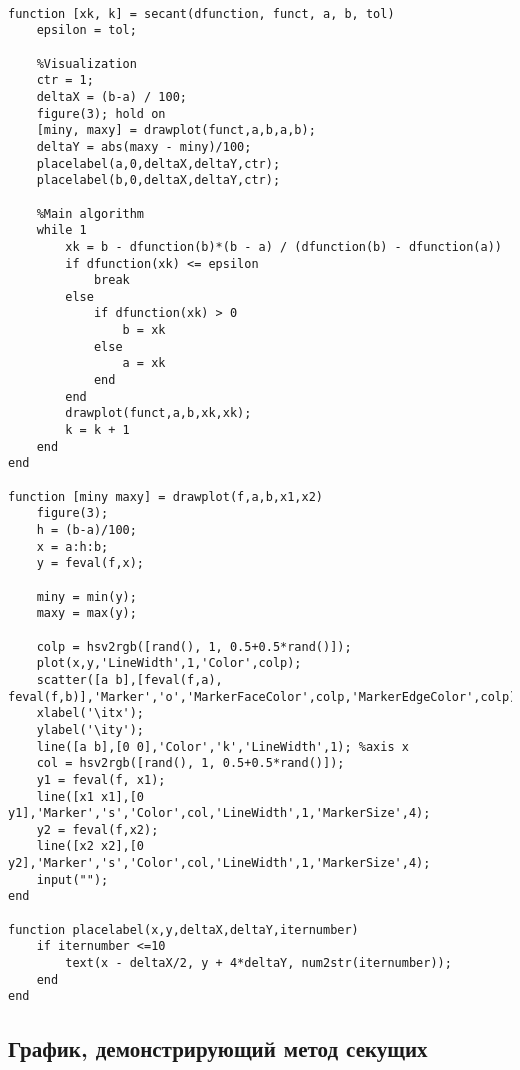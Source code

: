 \documentclass[a4paper,12pt]{article}
\begin{document}
\begin{lstlisting}[style=Matlab-editor, caption=Метод секущих]

function [xk, k] = secant(dfunction, funct, a, b, tol)
    epsilon = tol;
    
    %Visualization
    ctr = 1;
    deltaX = (b-a) / 100;
    figure(3); hold on
    [miny, maxy] = drawplot(funct,a,b,a,b);
    deltaY = abs(maxy - miny)/100;
    placelabel(a,0,deltaX,deltaY,ctr);
    placelabel(b,0,deltaX,deltaY,ctr);
    
    %Main algorithm
    while 1
        xk = b - dfunction(b)*(b - a) / (dfunction(b) - dfunction(a))
        if dfunction(xk) <= epsilon
            break
        else
            if dfunction(xk) > 0
                b = xk
            else
                a = xk
            end
        end
        drawplot(funct,a,b,xk,xk);
        k = k + 1
    end
end

function [miny maxy] = drawplot(f,a,b,x1,x2)
    figure(3); 
    h = (b-a)/100;
    x = a:h:b;
    y = feval(f,x);
    
    miny = min(y);
    maxy = max(y);
    
    colp = hsv2rgb([rand(), 1, 0.5+0.5*rand()]);
    plot(x,y,'LineWidth',1,'Color',colp);
    scatter([a b],[feval(f,a), feval(f,b)],'Marker','o','MarkerFaceColor',colp,'MarkerEdgeColor',colp);
    xlabel('\itx');
    ylabel('\ity');
    line([a b],[0 0],'Color','k','LineWidth',1); %axis x
    col = hsv2rgb([rand(), 1, 0.5+0.5*rand()]);
    y1 = feval(f, x1);
    line([x1 x1],[0 y1],'Marker','s','Color',col,'LineWidth',1,'MarkerSize',4); 
    y2 = feval(f,x2);
    line([x2 x2],[0 y2],'Marker','s','Color',col,'LineWidth',1,'MarkerSize',4); 
    input("");
end

function placelabel(x,y,deltaX,deltaY,iternumber)
    if iternumber <=10
        text(x - deltaX/2, y + 4*deltaY, num2str(iternumber));
    end
end

\end{lstlisting}

\subsection*{График, демонстрирующий метод секущих}
\end{document}
